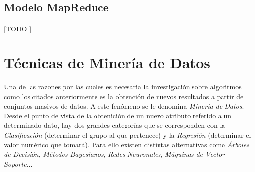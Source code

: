 \documentclass{article}
\begin{document}
    \subsection{Modelo MapReduce}

      \paragraph{}
      [TODO ]

  \section{Técnicas de Minería de Datos}

    \paragraph{}
    Una de las razones por las cuales es necesaria la investigación sobre algoritmos como los citados anteriormente es la obtención de nuevos resultados a partir de conjuntos masivos de datos. A este fenómeno se le denomina \emph{Minería de Datos}. Desde el punto de vista de la obtenición de un nuevo atributo referido a un determinado dato, hay dos grandes categorías que se corresponden con la \emph{Clasificación} (determinar el grupo al que pertenece) y la \emph{Regresión} (determinar el valor numérico que tomará). Para ello existen distintas alternativas como \emph{Árboles de Decisión}, \emph{Métodos Bayesianos}, \emph{Redes Neuronales}, \emph{Máquinas de Vector Soporte}...
\end{document}
